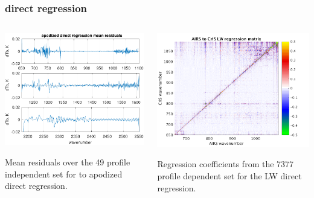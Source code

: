 \documentclass[10pt]{beamer}
\begin{document}
\begin{frame}
\frametitle{direct regression}
\begin{columns}[t]
\begin{column}{0.5\textwidth}
  \begin{centering}
  \includegraphics[width=\textwidth]{figures/ap_dir_regr.pdf}
  \end{centering}\vspace{3mm}
  Mean residuals over the 49 profile independent set for {\airs} to
  apodized {\cris} direct regression.

\end{column}
\begin{column}{0.5\textwidth}  
  \begin{centering}
  \includegraphics[width=\textwidth]{figures/LW_dir_regr_mat.png}
  \end{centering}\vspace{3mm}
  Regression coefficients from the 7377 profile dependent set for
  the LW direct regression.

\end{column}
\end{columns}
\end{frame}
\end{document}
